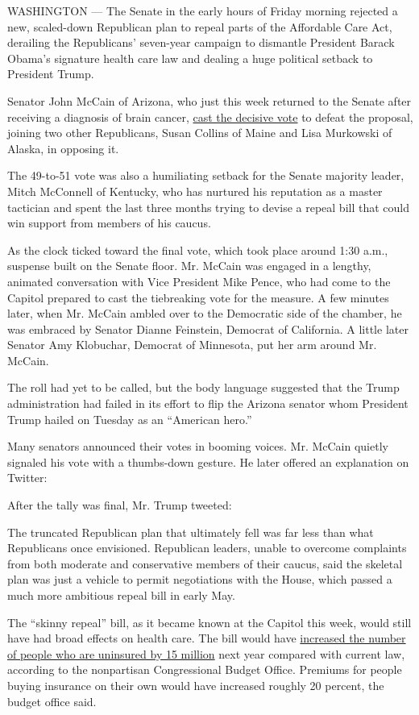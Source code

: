 WASHINGTON --- The Senate in the early hours of Friday morning rejected
a new, scaled-down Republican plan to repeal parts of the Affordable
Care Act, derailing the Republicans' seven-year campaign to dismantle
President Barack Obama's signature health care law and dealing a huge
political setback to President Trump.

Senator John McCain of Arizona, who just this week returned to the
Senate after receiving a diagnosis of brain cancer,
\href{https://www.nytimes.com/2017/07/28/us/politics/john-mccain-vote-trump-obamacare.html}{cast
the decisive vote} to defeat the proposal, joining two other
Republicans, Susan Collins of Maine and Lisa Murkowski of Alaska, in
opposing it.

The 49-to-51 vote was also a humiliating setback for the Senate majority
leader, Mitch McConnell of Kentucky, who has nurtured his reputation as
a master tactician and spent the last three months trying to devise a
repeal bill that could win support from members of his caucus.

As the clock ticked toward the final vote, which took place around 1:30
a.m., suspense built on the Senate floor. Mr. McCain was engaged in a
lengthy, animated conversation with Vice President Mike Pence, who had
come to the Capitol prepared to cast the tiebreaking vote for the
measure. A few minutes later, when Mr. McCain ambled over to the
Democratic side of the chamber, he was embraced by Senator Dianne
Feinstein, Democrat of California. A little later Senator Amy Klobuchar,
Democrat of Minnesota, put her arm around Mr. McCain.

The roll had yet to be called, but the body language suggested that the
Trump administration had failed in its effort to flip the Arizona
senator whom President Trump hailed on Tuesday as an ``American hero.''

Many senators announced their votes in booming voices. Mr. McCain
quietly signaled his vote with a thumbs-down gesture. He later offered
an explanation on Twitter:

After the tally was final, Mr. Trump tweeted:

The truncated Republican plan that ultimately fell was far less than
what Republicans once envisioned. Republican leaders, unable to overcome
complaints from both moderate and conservative members of their caucus,
said the skeletal plan was just a vehicle to permit negotiations with
the House, which passed a much more ambitious repeal bill in early May.

The ``skinny repeal'' bill, as it became known at the Capitol this week,
would still have had broad effects on health care. The bill would have
\href{https://www.cbo.gov/system/files/115th-congress-2017-2018/costestimate/s.a.667.pdf}{increased
the number of people who are uninsured by 15 million} next year compared
with current law, according to the nonpartisan Congressional Budget
Office. Premiums for people buying insurance on their own would have
increased roughly 20 percent, the budget office said.

